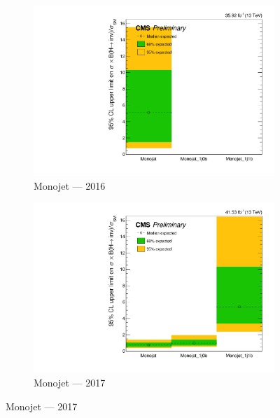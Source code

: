 \begin{figure}[htbp]
    \centering
    \begin{subfigure}[b]{0.45\textwidth}
        \includegraphics[width=\textwidth]{figures/limits/monojet/limit_2016_monojet_Scenario4.pdf}
        \caption{Monojet --- 2016}
    \end{subfigure}
    \hfill
    \begin{subfigure}[b]{0.45\textwidth}
        \includegraphics[width=\textwidth]{figures/limits/monojet/limit_2017_monojet_Scenario4.pdf}
        \caption{Monojet --- 2017}
    \end{subfigure}


\end{figure}
